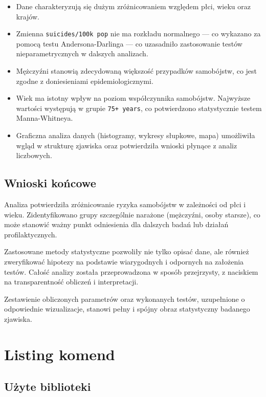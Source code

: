 \documentclass[polish]{article}
\begin{document}
    \begin{itemize}
        \item Dane charakteryzują się dużym zróżnicowaniem względem płci, wieku oraz krajów.
        \item Zmienna \texttt{suicides/100k pop} nie ma rozkładu normalnego — co wykazano za pomocą testu Andersona-Darlinga — co uzasadniło zastosowanie testów nieparametrycznych w dalszych analizach.
        \item Mężczyźni stanowią zdecydowaną większość przypadków samobójstw, co jest zgodne z doniesieniami epidemiologicznymi.
        \item Wiek ma istotny wpływ na poziom współczynnika samobójstw. Najwyższe wartości występują w grupie \texttt{75+ years}, co potwierdzono statystycznie testem Manna-Whitneya.
        \item Graficzna analiza danych (histogramy, wykresy słupkowe, mapa) umożliwiła wgląd w strukturę zjawiska oraz potwierdziła wnioski płynące z analiz liczbowych.
    \end{itemize}

    \subsection*{Wnioski końcowe}

    Analiza potwierdziła zróżnicowanie ryzyka samobójstw w zależności od płci i wieku. Zidentyfikowano grupy szczególnie narażone (mężczyźni, osoby starsze), co może stanowić ważny punkt odniesienia dla dalszych badań lub działań profilaktycznych.

    Zastosowane metody statystyczne pozwoliły nie tylko opisać dane, ale również zweryfikować hipotezy na podstawie wiarygodnych i odpornych na założenia testów. Całość analizy została przeprowadzona w sposób przejrzysty, z naciskiem na transparentność obliczeń i interpretacji.

    \bigskip

    Zestawienie obliczonych parametrów oraz wykonanych testów, uzupełnione o odpowiednie wizualizacje, stanowi pełny i spójny obraz statystyczny badanego zjawiska.

    \newpage

    \section{Listing komend}

    \subsection{Użyte biblioteki}
\end{document}
